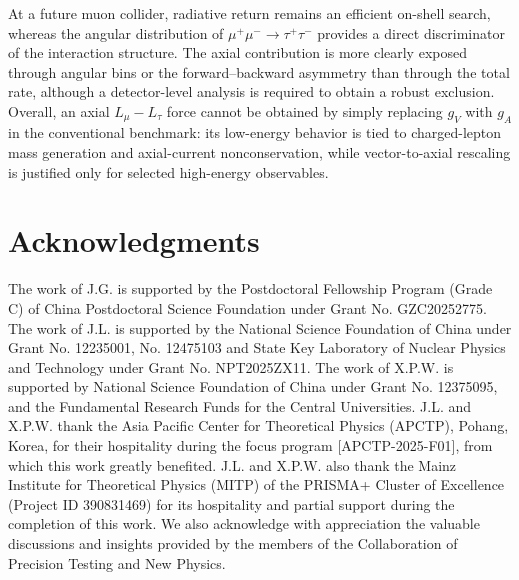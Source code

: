\documentclass[onecolumn, aps, nofootinbib, prd, preprint, floats, floatfix, amsmath, amssymb, superscriptaddress, preprintnumbers]{revtex4-1}
\begin{document}
At a future muon collider, radiative return remains an efficient on-shell search, whereas the angular distribution of $\mu^+\mu^-\to\tau^+\tau^-$ provides a direct discriminator of the interaction structure. The axial contribution is more clearly exposed through angular bins or the forward--backward asymmetry than through the total rate, although a detector-level analysis is required to obtain a robust exclusion. Overall, an axial $L_\mu-L_\tau$ force cannot be obtained by simply replacing $g_V$ with $g_A$ in the conventional benchmark: its low-energy behavior is tied to charged-lepton mass generation and axial-current nonconservation, while vector-to-axial rescaling is justified only for selected high-energy observables.



\section{Acknowledgments}
The work of J.G. is supported by the Postdoctoral Fellowship Program (Grade C) of China Postdoctoral Science Foundation under Grant No. GZC20252775.
The work of J.L. is supported by the National Science Foundation of China under Grant No. 12235001, No. 12475103
and State Key Laboratory of Nuclear Physics and Technology under Grant No. NPT2025ZX11. 
The work of X.P.W. is supported by National Science Foundation of China under Grant No. 12375095, and the Fundamental Research Funds for the Central Universities.
J.L. and X.P.W. thank the Asia Pacific Center for Theoretical Physics (APCTP), Pohang, Korea, for their hospitality during the focus program [APCTP-2025-F01], from which this work greatly benefited. J.L. and X.P.W. also thank the Mainz Institute for Theoretical Physics (MITP) of the PRISMA+ Cluster of Excellence (Project ID 390831469) for its hospitality and partial support during the completion of this work. We also acknowledge with appreciation the valuable discussions and insights provided by the members of the Collaboration of Precision Testing and New Physics.



\end{document}
